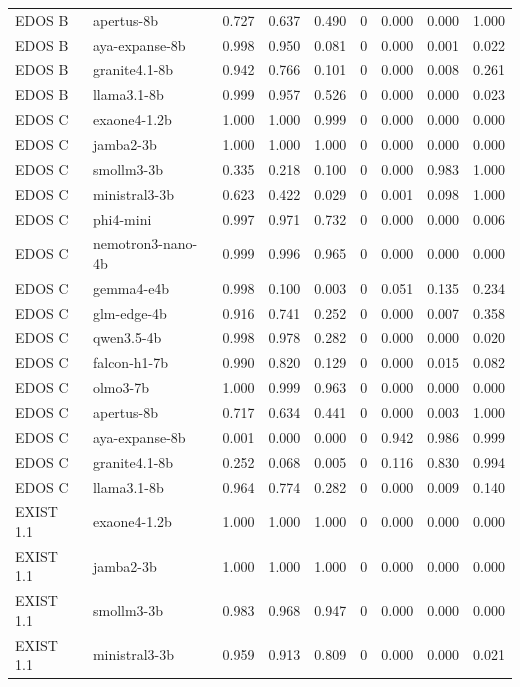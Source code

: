 \begin{table}[t]
\begin{tabular}{llrrrrrrr}
EDOS B & apertus-8b & 0.727 & 0.637 & 0.490 & 0 & 0.000 & 0.000 & 1.000 \\
EDOS B & aya-expanse-8b & 0.998 & 0.950 & 0.081 & 0 & 0.000 & 0.001 & 0.022 \\
EDOS B & granite4.1-8b & 0.942 & 0.766 & 0.101 & 0 & 0.000 & 0.008 & 0.261 \\
EDOS B & llama3.1-8b & 0.999 & 0.957 & 0.526 & 0 & 0.000 & 0.000 & 0.023 \\
EDOS C & exaone4-1.2b & 1.000 & 1.000 & 0.999 & 0 & 0.000 & 0.000 & 0.000 \\
EDOS C & jamba2-3b & 1.000 & 1.000 & 1.000 & 0 & 0.000 & 0.000 & 0.000 \\
EDOS C & smollm3-3b & 0.335 & 0.218 & 0.100 & 0 & 0.000 & 0.983 & 1.000 \\
EDOS C & ministral3-3b & 0.623 & 0.422 & 0.029 & 0 & 0.001 & 0.098 & 1.000 \\
EDOS C & phi4-mini & 0.997 & 0.971 & 0.732 & 0 & 0.000 & 0.000 & 0.006 \\
EDOS C & nemotron3-nano-4b & 0.999 & 0.996 & 0.965 & 0 & 0.000 & 0.000 & 0.000 \\
EDOS C & gemma4-e4b & 0.998 & 0.100 & 0.003 & 0 & 0.051 & 0.135 & 0.234 \\
EDOS C & glm-edge-4b & 0.916 & 0.741 & 0.252 & 0 & 0.000 & 0.007 & 0.358 \\
EDOS C & qwen3.5-4b & 0.998 & 0.978 & 0.282 & 0 & 0.000 & 0.000 & 0.020 \\
EDOS C & falcon-h1-7b & 0.990 & 0.820 & 0.129 & 0 & 0.000 & 0.015 & 0.082 \\
EDOS C & olmo3-7b & 1.000 & 0.999 & 0.963 & 0 & 0.000 & 0.000 & 0.000 \\
EDOS C & apertus-8b & 0.717 & 0.634 & 0.441 & 0 & 0.000 & 0.003 & 1.000 \\
EDOS C & aya-expanse-8b & 0.001 & 0.000 & 0.000 & 0 & 0.942 & 0.986 & 0.999 \\
EDOS C & granite4.1-8b & 0.252 & 0.068 & 0.005 & 0 & 0.116 & 0.830 & 0.994 \\
EDOS C & llama3.1-8b & 0.964 & 0.774 & 0.282 & 0 & 0.000 & 0.009 & 0.140 \\
EXIST 1.1 & exaone4-1.2b & 1.000 & 1.000 & 1.000 & 0 & 0.000 & 0.000 & 0.000 \\
EXIST 1.1 & jamba2-3b & 1.000 & 1.000 & 1.000 & 0 & 0.000 & 0.000 & 0.000 \\
EXIST 1.1 & smollm3-3b & 0.983 & 0.968 & 0.947 & 0 & 0.000 & 0.000 & 0.000 \\
EXIST 1.1 & ministral3-3b & 0.959 & 0.913 & 0.809 & 0 & 0.000 & 0.000 & 0.021 \\

\end{tabular}
\end{table}
